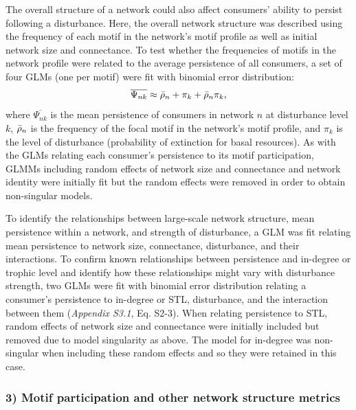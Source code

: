 \documentclass[12pt]{article}
\begin{document}
\begin{spacing}{2.0}
            The overall structure of a network could also affect consumers' ability to persist following a disturbance.
            Here, the overall network structure was described using the frequency of each motif in the network's motif profile as well as initial network size and connectance.
            To test whether the frequencies of motifs in the network profile were related to the average persistence of all consumers, a set of four GLMs  (one per motif) were fit with binomial error distribution:
                \begin{equation}
                    \overline{\Psi_{nk}} \approx \Bar{\rho}_{n} + \pi_{k} + \Bar{\rho}_{n}\pi_{k},
                    \label{netpropeq}
                \end{equation}
            \noindent where $\overline{\Psi_{nk}}$ is the mean persistence of consumers in network $n$ at disturbance level $k$, $\Bar{\rho}_{n}$ is the frequency of the focal motif in the network's motif profile, and $\pi_k$ is the level of disturbance (probability of extinction for basal resources).
            As with the GLMs relating each consumer's persistence to its motif participation, GLMMs including random effects of network size and connectance and network identity were initially fit but the random effects were removed in order to obtain non-singular models.


            To identify the relationships between large-scale network structure,  mean persistence within a network, and strength of disturbance, a GLM was fit relating mean persistence to network size, connectance, disturbance, and their interactions.
            To confirm known relationships between persistence and in-degree or trophic level and identify how these relationships might vary with disturbance strength, two GLMs were fit with binomial error distribution relating a consumer's persistence to in-degree or STL, disturbance, and the interaction between them (\emph{Appendix S3.1}, Eq. S2-3).
            When relating persistence to STL, random effects of network size and connectance were initially included but removed due to model singularity as above.
            The model for in-degree was non-singular when including these random effects and so they were retained in this case.



        \subsubsection*{3) Motif participation and other network structure metrics}


\end{spacing}
\end{document}

